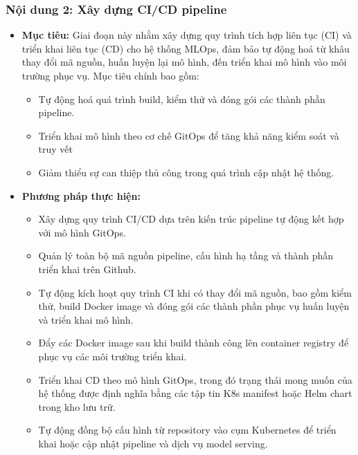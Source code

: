 \subsubsection{Nội dung 2: Xây dựng CI/CD pipeline}

\begin{itemize}
    \item \textbf{Mục tiêu:}
    Giai đoạn này nhằm xây dựng quy trình tích hợp liên tục (CI) và triển khai liên tục (CD) cho hệ thống MLOps, đảm bảo tự động hoá từ khâu thay đổi mã nguồn, huấn luyện lại mô hình, đến triển khai mô hình vào môi trường phục vụ. Mục tiêu chính bao gồm: 
        \begin{itemize}
            \item Tự động hoá quá trình build, kiểm thử và đóng gói các thành phần pipeline.
            \item Triển khai mô hình theo cơ chế GitOps để tăng khả năng kiểm soát và truy vết
            \item Giảm thiểu sự can thiệp thủ công trong quá trình cập nhật hệ thống.
        \end{itemize}
    
    \item \textbf{Phương pháp thực hiện:}
        \begin{itemize}
            \item Xây dựng quy trình CI/CD dựa trên kiến trúc pipeline tự động kết hợp với mô hình GitOps.
            \item Quản lý toàn bộ mã nguồn pipeline, cấu hình hạ tầng và thành phần triển khai trên Github.
            \item Tự động kích hoạt quy trình CI khi có thay đổi mã nguồn, bao gồm kiểm thử, build Docker image và đóng gói các thành phần phục vụ huấn luyện và triển khai mô hình.
            \item Đẩy các Docker image sau khi build thành công lên container registry để phục vụ các môi trường triển khai.
            \item Triển khai CD theo mô hình GitOps, trong đó trạng thái mong muốn của hệ thống được định nghĩa bằng các tập tin K8s manifest hoặc Helm chart trong kho lưu trữ.
            \item Tự động đồng bộ cấu hình từ repository vào cụm Kubernetes để triển khai hoặc cập nhật pipeline và dịch vụ model serving.
\end{itemize}

\end{itemize}

